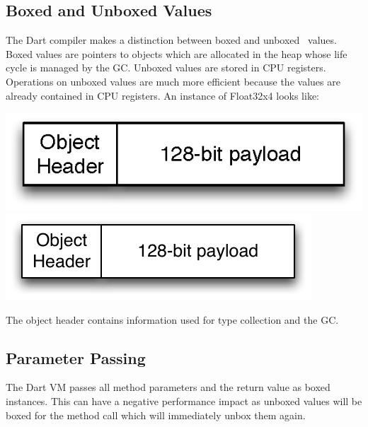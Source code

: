 \documentclass[preprint]{sigplanconf}
\begin{document}
\subsection{Boxed and Unboxed Values}
\label{boxing}

The Dart compiler makes a distinction between boxed and  unboxed~\cite{unboxing}
values. Boxed values are pointers to objects which are allocated in the heap
whose life cycle is managed by the GC. Unboxed values are stored in CPU
registers. Operations on unboxed values are much more efficient because the
values are already contained in CPU registers. An instance of Float32x4 looks
like:

\ifx\pdfoutput\undefined
\includegraphics{figures/boxedobject.eps}
\else
\includegraphics{figures/boxedobject-eps-converted-to.pdf}
\fi

The object header contains information used for type collection and the GC.

\subsection{Parameter Passing}

The Dart VM passes all method parameters and the return value as boxed
instances. This can have a negative performance impact as unboxed values will be
boxed for the method call which will immediately unbox them again.
\end{document}

